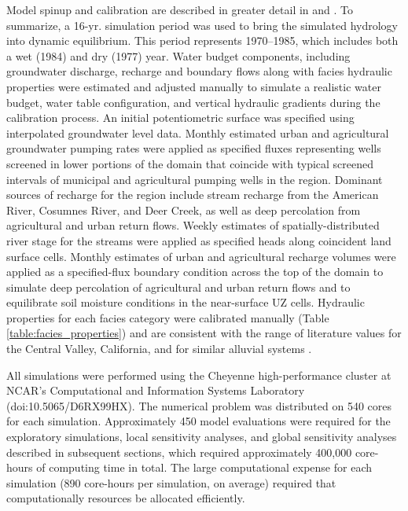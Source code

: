 Model spinup and calibration are described in greater detail in \cite{liu2014thesis} and \cite{maples_2019}. To summarize, a 16-yr. simulation period was used to bring the simulated hydrology into dynamic equilibrium. This period represents 1970–1985, which includes both a wet (1984) and dry (1977) year. Water budget components, including groundwater discharge, recharge and boundary flows along with facies hydraulic properties were estimated and adjusted manually to simulate a realistic water budget, water table configuration, and vertical hydraulic gradients during the calibration process. An initial potentiometric surface was specified using interpolated groundwater level data. Monthly estimated urban and agricultural groundwater pumping rates were applied as specified fluxes representing wells screened in lower portions of the domain that coincide with typical screened intervals of municipal and agricultural pumping wells in the region. Dominant sources of recharge for the region include stream recharge from the American River, Cosumnes River, and Deer Creek, as well as deep percolation from agricultural and urban return flows. Weekly estimates of spatially-distributed river stage for the streams were applied as specified heads along coincident land surface cells. Monthly estimates of urban and agricultural recharge volumes were applied as a specified-flux boundary condition across the top of the domain to simulate deep percolation of agricultural and urban return flows and to equilibrate soil moisture conditions in the near-surface UZ cells. Hydraulic properties for each facies category were calibrated manually (Table \ref{table:facies_properties}) and are consistent with the range of literature values for the Central Valley, California, and for similar alluvial systems \citep{anderson2015applied,botros2009spatial,fleckenstein2004managing,frei2009patterns,maserjian1993hydrogeologic,niswonger2008influence,sager2012effects}.



All simulations were performed using the Cheyenne high-performance cluster at NCAR's Computational and Information Systems Laboratory (doi:10.5065/D6RX99HX). The numerical problem was distributed on 540 cores for each simulation. Approximately 450 model evaluations were required for the exploratory simulations, local sensitivity analyses, and global sensitivity analyses described in subsequent sections, which required approximately 400,000 core-hours of computing time in total. The large computational expense for each simulation (890 core-hours per simulation, on average) required that computationally resources be allocated efficiently. 

